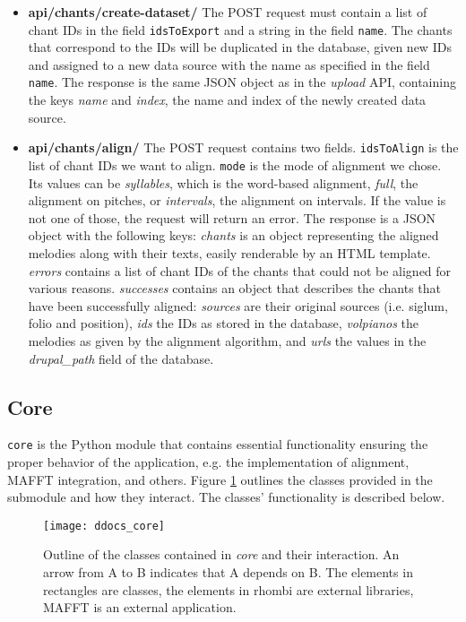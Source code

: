 \begin{itemize}
\item \textbf{api/chants/create-dataset/} The POST request must contain a list of chant IDs in the field \verb|idsToExport| and a string in the field \verb|name|. The chants
that correspond to the IDs will be duplicated in the database, given new IDs and assigned to a new data source with the name as specified in the field \verb|name|.
The response is the same JSON object as in the \emph{upload} API, containing the keys \emph{name} and \emph{index}, the name and index of the newly created data source.

\item \textbf{api/chants/align/} The POST request contains two fields. \verb|idsToAlign| is the list of chant IDs we want to align. \verb|mode| is the mode of alignment we chose.
Its values can be \emph{syllables}, which is the word-based alignment, \emph{full}, the alignment on pitches, or \emph{intervals}, the alignment on intervals. If the
value is not one of those, the request will return an error. The response is a JSON object with the following keys: \emph{chants} is an object representing the
aligned melodies along with their texts, easily renderable by an HTML template. \emph{errors} contains a list of chant IDs of the chants that could not be aligned for
various reasons. \emph{successes} contains an object that describes the chants that have been successfully aligned: \emph{sources} are their original sources (i.e.
siglum, folio and position), \emph{ids} the IDs as stored in the database, \emph{volpianos} the melodies as given by the alignment algorithm, and \emph{urls} the
values in the \emph{drupal\_path} field of the database.

\end{itemize}

\subsection{Core}

\verb|core| is the Python module that contains essential functionality ensuring the proper behavior of the application, e.g. the implementation of alignment,
MAFFT integration, and others. Figure \ref{fig:core} outlines the classes provided in the submodule and how they interact. The classes' functionality
is described below.

\begin{figure}[!h]
\centering
\texttt{[image: ddocs\_core]}
\caption{Outline of the classes contained in \emph{core} and their interaction. An arrow from A to B indicates that A depends on B. The elements in rectangles are classes,
the elements in rhombi are external libraries, MAFFT is an external application.}
\label{fig:core}
\end{figure}

